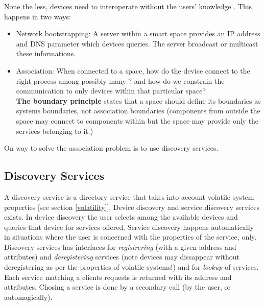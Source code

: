 None the less, devices need to interoperate without the users' knowledge . This happens in two ways: 

\begin{itemize}
\item Network bootstrapping: A server within a smart space provides an IP address and DNS parameter which  devices queries. The server broadcast or multicast these informations. 
\item Association: When connected to a space, how do the device connect to the right process among possibly many ? and how do we constrain the communication to only devices within that particular space? \\

\textbf{The boundary principle} states that a space should define its boundaries as systems boundaries, not association boundaries (components from outside the space may connect to components within but the space may provide only the services belonging to it.) 
\end{itemize}

On way to solve the association problem is to use discovery services. 

\subsection{Discovery Services}

A discovery service is a directory service that takes into account volatile system properties [see section  \ref*{volatility}].  Device discovery and service discovery services exists. In device discovery the user selects among the available devices and queries that device for services offered. Service discovery happens automatically in situations where the user is concerned with the properties of the service, only.  \\

Discovery services has interfaces for \textit{registrering} (with a given address and attributes) and \textit{deregistering} services (note devices may dissappear without deregistering as per the properties of volatile systems!) and for \textit{lookup} of services. Each service matching a clients requests is returned with its address and attributes. Chosing a service is done by a secondary call (by the user, or automagically). \\


